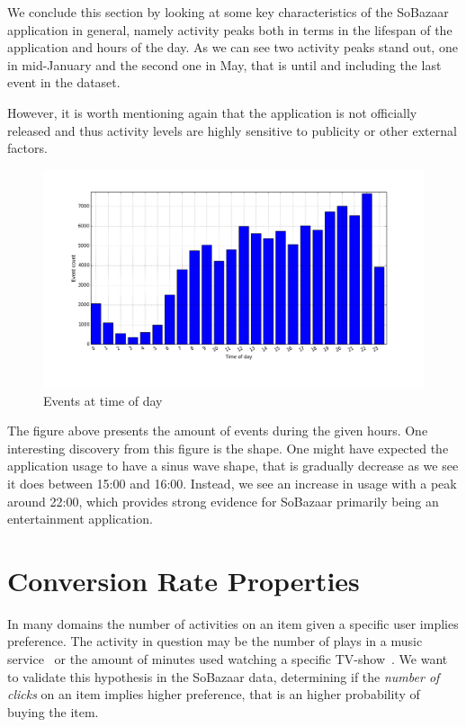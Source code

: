 We conclude this section by looking at some key characteristics of the SoBazaar
application in general, namely activity peaks both in terms in the lifespan of
the application and hours of the day. As we can see two activity peaks stand
out, one in mid-January and the second one in May, that is until and including
the last event in the dataset.

However, it is worth mentioning again that the application is not officially
released and thus activity levels are highly sensitive to publicity or other
external factors.

\begin{figure}[H]
  \centering
  \includegraphics[width=5in]{image/hrdistribution.png}
  \caption{Events at time of day}
  \label{figure:timeOfDayDistr}
\end{figure}

The figure above presents the amount of events during the given hours. One
interesting discovery from this figure is the shape. One might have expected
the application usage to have a sinus wave shape, that is gradually decrease as
we see it does between 15:00 and 16:00. Instead, we see an increase in usage
with a peak around 22:00, which provides strong evidence for SoBazaar primarily
being an entertainment application.

\section{Conversion Rate Properties}
\label{sec:conv-rate}

In many domains the number of activities on an item given a specific user
implies preference. The activity in question may be the number of plays in a
music service~\cite{parra2011walk} or the amount of minutes used watching a
specific TV-show~\cite{Hu2008}. We want to validate this
hypothesis in the SoBazaar data, determining if the \textit{number of clicks}
on an item implies higher preference, that is an higher probability of buying
the item.

